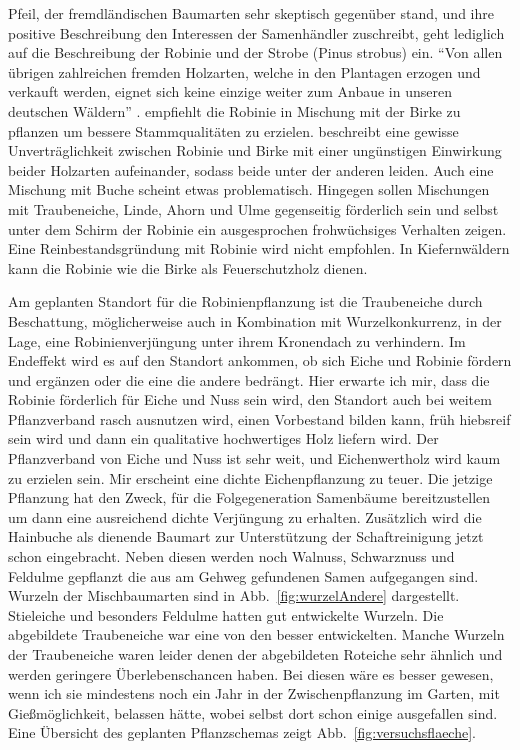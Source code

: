 \documentclass[twocolumn]{scrartcl}
\begin{document}
\citet[S.~174ff]{pfeil1829deutscheWaldbaeume} Pfeil, der
fremdländischen Baumarten sehr skeptisch gegenüber stand, und ihre
positive Beschreibung den Interessen der Samenhändler zuschreibt, geht
lediglich auf die Beschreibung der Robinie und der Strobe (Pinus
strobus) ein. \enquote{Von allen übrigen zahlreichen fremden
  Holzarten, welche in den Plantagen erzogen und verkauft werden,
  eignet sich keine einzige weiter zum Anbaue in unseren deutschen
  Wäldern} \citep{pfeil1860holzzucht}.  \citet{pfeil1850robinie}
empfiehlt die Robinie in Mischung mit der Birke zu pflanzen um bessere
Stammqualitäten zu
erzielen. \citet[S.~88--96]{erteld1952robinieErtrag} beschreibt eine
gewisse Unverträglichkeit zwischen Robinie und Birke mit einer
ungünstigen Einwirkung beider Holzarten aufeinander, sodass beide
unter der anderen leiden. Auch eine Mischung mit Buche scheint etwas
problematisch. Hingegen sollen Mischungen mit Traubeneiche, Linde,
Ahorn und Ulme gegenseitig förderlich sein und selbst unter dem Schirm
der Robinie ein ausgesprochen frohwüchsiges Verhalten zeigen. Eine
Reinbestandsgründung mit Robinie wird nicht empfohlen. In Kiefernwäldern
kann die Robinie wie die Birke als Feuerschutzholz dienen.

Am geplanten Standort für die Robinienpflanzung ist die Traubeneiche durch Beschattung,
möglicherweise auch in Kombination mit Wurzelkonkurrenz, in der Lage, eine Robinienverjüngung unter ihrem Kronendach zu verhindern.
Im Endeffekt wird es auf
den Standort ankommen, ob sich Eiche und Robinie fördern und ergänzen
oder die eine die andere bedrängt. Hier erwarte ich mir, dass die
Robinie förderlich für Eiche und Nuss sein wird, den Standort auch bei
weitem Pflanzverband rasch ausnutzen wird, einen Vorbestand bilden
kann, früh hiebsreif sein wird und dann ein qualitative hochwertiges
Holz liefern wird. Der Pflanzverband von Eiche und Nuss ist
sehr weit, und Eichenwertholz wird kaum zu erzielen sein. Mir
erscheint eine dichte Eichenpflanzung zu teuer. Die jetzige Pflanzung
hat den Zweck, für die Folgegeneration Samenbäume bereitzustellen um
dann eine ausreichend dichte Verjüngung zu erhalten. Zusätzlich wird
die Hainbuche als dienende Baumart zur Unterstützung der
Schaftreinigung jetzt schon eingebracht. Neben diesen werden noch
Walnuss, Schwarznuss und Feldulme gepflanzt die aus am Gehweg gefundenen
Samen aufgegangen sind. Wurzeln der Mischbaumarten sind in
Abb.~\ref{fig:wurzelAndere} dargestellt. Stieleiche und besonders Feldulme
hatten gut entwickelte Wurzeln. Die abgebildete Traubeneiche war eine
von den besser entwickelten. Manche Wurzeln der Traubeneiche waren leider denen der abgebildeten
Roteiche sehr ähnlich und werden geringere Überlebenschancen haben. Bei diesen wäre es besser gewesen, wenn ich sie mindestens
noch ein Jahr in der Zwischenpflanzung im Garten, mit Gießmöglichkeit,
belassen hätte, wobei selbst dort schon einige ausgefallen
sind. Eine Übersicht des geplanten Pflanzschemas zeigt
Abb.~\ref{fig:versuchsflaeche}.
\end{document}
